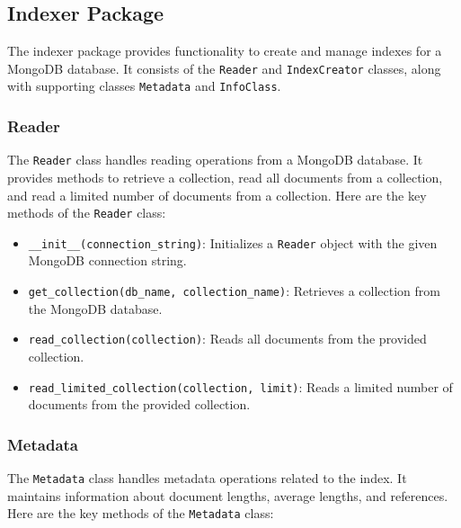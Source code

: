 \documentclass{article}
\begin{document}
\subsection{Indexer Package}

The indexer package provides functionality to create and manage indexes for a MongoDB database. 
It consists of the \texttt{Reader} and \texttt{IndexCreator} classes, along with supporting 
classes \texttt{Metadata} and \texttt{InfoClass}.

\subsubsection{Reader}

The \texttt{Reader} class handles reading operations from a MongoDB database. It provides 
methods to retrieve a collection, read all documents from a collection, and read a limited 
number of documents from a collection. Here are the key methods of the \texttt{Reader} class:

\begin{itemize}
    \item \texttt{\_\_init\_\_(connection\_string)}: Initializes a \texttt{Reader} object with 
    the given MongoDB connection string.
    \item \texttt{get\_collection(db\_name, collection\_name)}: Retrieves a collection from the 
    MongoDB database.
    \item \texttt{read\_collection(collection)}: Reads all documents from the provided 
    collection.
    \item \texttt{read\_limited\_collection(collection, limit)}: Reads a limited number of 
    documents from the provided collection.
\end{itemize}

\subsubsection{Metadata}

The \texttt{Metadata} class handles metadata operations related to the index. It maintains 
information about document lengths, average lengths, and references. Here are the key methods of 
the \texttt{Metadata} class:
\end{document}
